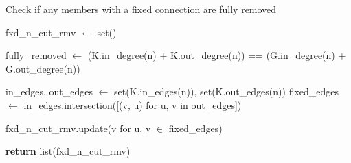     \begin{algorithm*}[h]
        \scriptsize
        \caption*{Check if any members with a fixed connection are fully removed}
        \label{alg:check_fixed_nodes_cut}
        
        \begin{algorithmic}[1]
        
            \State fxd\_n\_cut\_rmv $\gets$ set()
        
                \State fully\_removed $\gets$ (K.in\_degree(n) + K.out\_degree(n)) == (G.in\_degree(n) + G.out\_degree(n))
        
                    \State in\_edges, out\_edges $\gets$ set(K.in\_edges(n)), set(K.out\_edges(n))
                    \State fixed\_edges $\gets$ in\_edges.intersection([(v, u) for u, v in out\_edges])
        
                        \State fxd\_n\_cut\_rmv.update(v for u, v $\in$ fixed\_edges)
                    \EndIf
                \EndIf
            \EndFor
        
            \State \textbf{return} list(fxd\_n\_cut\_rmv)
        \EndFunction
        \end{algorithmic}
    \end{algorithm*}

    \vspace{-1.0em}
    
